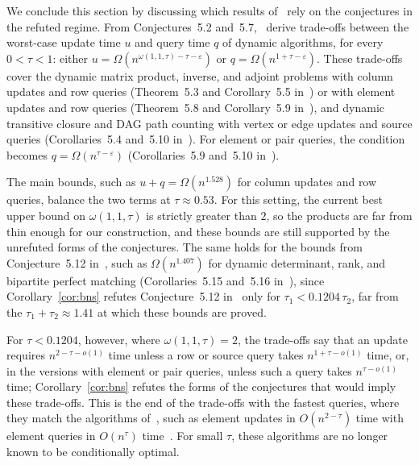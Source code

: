 We conclude this section by discussing which results of~\cite{BNS19} rely on the conjectures in the refuted regime. From Conjectures~5.2 and~5.7,~\cite{BNS19} derive trade-offs between the worst-case update time $u$ and query time $q$ of dynamic algorithms, for every $0<\tau<1$: either $u=\Omega(n^{\omega(1,1,\tau)-\tau-\varepsilon})$ or $q=\Omega(n^{1+\tau-\varepsilon})$. These trade-offs cover the dynamic matrix product, inverse, and adjoint problems with column updates and row queries (Theorem~5.3 and Corollary~5.5 in~\cite{BNS19}) or with element updates and row queries (Theorem~5.8 and Corollary~5.9 in~\cite{BNS19}), and dynamic transitive closure and DAG path counting with vertex or edge updates and source queries (Corollaries~5.4 and~5.10 in~\cite{BNS19}). For element or pair queries, the condition becomes $q=\Omega(n^{\tau-\varepsilon})$ (Corollaries~5.9 and~5.10 in~\cite{BNS19}).

The main bounds, such as $u+q=\Omega(n^{1.528})$ for column updates and row queries, balance the two terms at $\tau\approx0.53$. For this setting, the current best upper bound on $\omega(1,1,\tau)$ is strictly greater than $2$, so the products are far from thin enough for our construction, and these bounds are still supported by the unrefuted forms of the conjectures. The same holds for the bounds from Conjecture~5.12 in~\cite{BNS19}, such as $\Omega(n^{1.407})$ for dynamic determinant, rank, and bipartite perfect matching (Corollaries~5.15 and~5.16 in~\cite{BNS19}), since Corollary~\ref{cor:bns} refutes Conjecture~5.12 in~\cite{BNS19} only for $\tau_1<0.1204\,\tau_2$, far from the $\tau_1+\tau_2\approx1.41$ at which these bounds are proved.

For $\tau<0.1204$, however, where $\omega(1,1,\tau)=2$, the trade-offs say that an update requires $n^{2-\tau-o(1)}$ time unless a row or source query takes $n^{1+\tau-o(1)}$ time, or, in the versions with element or pair queries, unless such a query takes $n^{\tau-o(1)}$ time; Corollary~\ref{cor:bns} refutes the forms of the conjectures that would imply these trade-offs. This is the end of the trade-offs with the fastest queries, where they match the algorithms of~\cite{San04,BNS19}, such as element updates in $O(n^{2-\tau})$ time with element queries in $O(n^{\tau})$ time~\cite[Theorem~3]{San04}. For small $\tau$, these algorithms are no longer known to be conditionally optimal.

